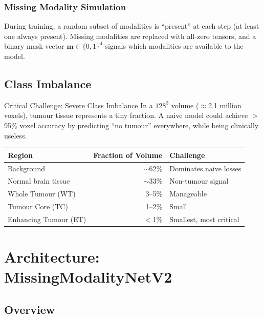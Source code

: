 \documentclass[12pt,a4paper]{article}
\begin{document}
\subsubsection{Missing Modality Simulation}
During training, a random subset of modalities is ``present'' at each step (at least one always present). Missing modalities are replaced with all-zero tensors, and a binary mask vector $\mathbf{m} \in \{0,1\}^4$ signals which modalities are available to the model.

\subsection{Class Imbalance}

\begin{warningbox}{Critical Challenge: Severe Class Imbalance}
In a $128^3$ volume ($\approx$2.1 million voxels), tumour tissue represents a tiny fraction. A naive model could achieve $>$95\% voxel accuracy by predicting ``no tumour'' everywhere, while being clinically useless.
\end{warningbox}

\begin{center}
\begin{tabular}{lrl}
\toprule
Region & Fraction of Volume & Challenge \\
\midrule
Background & $\sim$62\% & Dominates naive losses \\
Normal brain tissue & $\sim$33\% & Non-tumour signal \\
Whole Tumour (WT) & 3--5\% & Manageable \\
Tumour Core (TC) & 1--2\% & Small \\
Enhancing Tumour (ET) & $<$1\% & Smallest, most critical \\
\bottomrule
\end{tabular}
\end{center}

\section{Architecture: MissingModalityNetV2}

\subsection{Overview}
\end{document}
